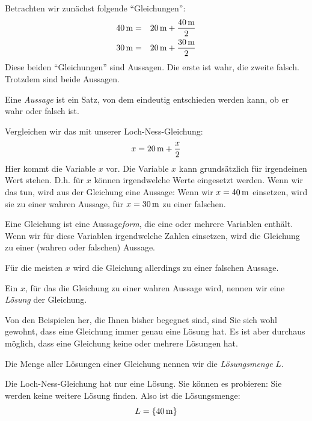 \documentclass[%
11pt,%
twoside,%
titlepage,%
german,%
]{scrartcl}
\begin{document}
Betrachten wir zun\"achst folgende ``Gleichungen'':
\begin{eqnarray*}
  \unit[40]{m} & = & \unit[20]{m}+\frac{\unit[40]{m}}{2} \\
  \unit[30]{m} & = & \unit[20]{m} + \frac{\unit[30]{m}}{2}
\end{eqnarray*}
Diese beiden ``Gleichungen'' sind Aussagen. Die erste ist wahr, die zweite falsch. Trotzdem sind beide Aussagen. 
\begin{cdef}[Aussage]{}
  Eine \emph{Aussage} ist ein Satz, von dem eindeutig entschieden werden kann, ob er wahr oder falsch ist.
\end{cdef}
Vergleichen wir das mit unserer Loch-Ness-Gleichung:
\begin{displaymath}
  x = \unit[20]{m} + \frac{x}{2}
\end{displaymath}
Hier kommt die Variable $x$ vor. Die Variable $x$ kann grunds\"atzlich f\"ur irgendeinen Wert stehen. D.h. f\"ur $x$ k\"onnen irgendwelche Werte eingesetzt werden. Wenn wir das tun, wird aus der Gleichung eine Aussage: Wenn wir $x=\unit[40]{m}$ einsetzen, wird sie zu einer wahren Aussage, f\"ur $x=\unit[30]{m}$ zu einer falschen.
\begin{cdef}[Aussageform]{}
  Eine Gleichung ist eine Aussage\emph{form}, die eine oder mehrere Variablen enth\"alt. Wenn wir f\"ur diese Variablen irgendwelche Zahlen einsetzen, wird die Gleichung zu einer (wahren oder falschen) Aussage.
\end{cdef}
F\"ur die meisten $x$ wird die Gleichung allerdings zu einer falschen Aussage. 
\begin{cdef}[Lösung]{}
  Ein $x$, f\"ur das die Gleichung zu einer wahren Aussage wird, nennen wir eine \emph{L\"osung} der Gleichung. 
\end{cdef}
Von den Beispielen her, die Ihnen bisher begegnet sind, sind Sie sich wohl gewohnt, dass eine Gleichung immer genau eine L\"osung hat. Es ist aber durchaus m\"oglich, dass eine Gleichung keine oder mehrere L\"osungen hat.
\begin{cdef}[Lösungsmenge]{}
  Die Menge aller L\"osungen einer Gleichung nennen wir die \emph{L\"osungsmenge} $L$.  
\end{cdef}
Die Loch-Ness-Gleichung hat nur eine L\"osung. Sie k\"onnen es probieren: Sie werden keine weitere L\"osung finden. Also ist die L\"osungsmenge:
\begin{displaymath}
  L=\{\unit[40]{m}\}
\end{displaymath}
\end{document}
